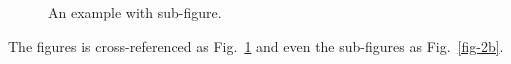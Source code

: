 \documentclass[
  journal,
]{IEEEtran}%
\theoremstyle{plain}
\theoremstyle{remark}
\begin{document}
\begin{figure}

\begin{minipage}[t]{0.50\linewidth}

{\centering 


}

\subcaption{\label{fig-2a}}
\end{minipage}%
%
\begin{minipage}[t]{0.50\linewidth}

{\centering 


}

\subcaption{\label{fig-2b}}
\end{minipage}%

\caption{\label{fig-2}An example with sub-figure.}

\end{figure}

The figures is cross-referenced as Fig.~\ref{fig-2} and even the
sub-figures as Fig.~\ref{fig-2b}.
\end{document}
